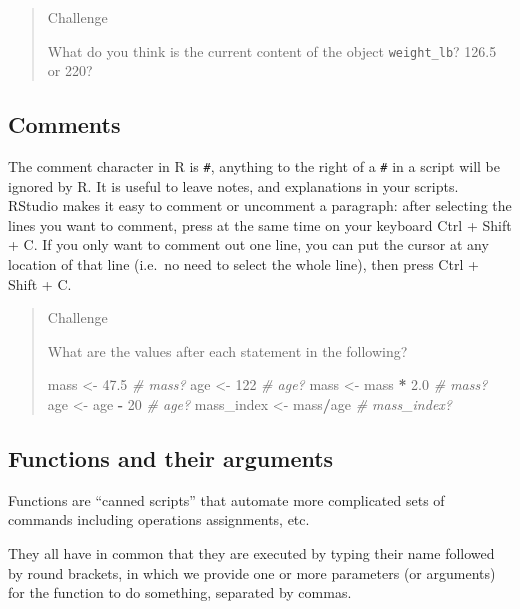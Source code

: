 \documentclass[]{book}
\newenvironment{Shaded}{\begin{snugshade}}{\end{snugshade}}
\newcommand{\DecValTok}[1]{\textcolor[rgb]{0.00,0.00,0.81}{#1}}
\newcommand{\FloatTok}[1]{\textcolor[rgb]{0.00,0.00,0.81}{#1}}
\newcommand{\StringTok}[1]{\textcolor[rgb]{0.31,0.60,0.02}{#1}}
\newcommand{\CommentTok}[1]{\textcolor[rgb]{0.56,0.35,0.01}{\textit{#1}}}
\newcommand{\OperatorTok}[1]{\textcolor[rgb]{0.81,0.36,0.00}{\textbf{#1}}}
\newcommand{\NormalTok}[1]{#1}
\theoremstyle{definition}
\theoremstyle{definition}
\theoremstyle{definition}
\theoremstyle{remark}
\begin{document}
\begin{quote}
Challenge

What do you think is the current content of the object
\texttt{weight\_lb}? 126.5 or 220?
\end{quote}

\subsection{Comments}\label{comments}

The comment character in R is \texttt{\#}, anything to the right of a
\texttt{\#} in a script will be ignored by R. It is useful to leave
notes, and explanations in your scripts. RStudio makes it easy to
comment or uncomment a paragraph: after selecting the lines you want to
comment, press at the same time on your keyboard Ctrl + Shift + C. If
you only want to comment out one line, you can put the cursor at any
location of that line (i.e.~no need to select the whole line), then
press Ctrl + Shift + C.

\begin{quote}
Challenge

What are the values after each statement in the following?

\begin{Shaded}
\begin{Highlighting}[]
\NormalTok{mass <-}\StringTok{ }\FloatTok{47.5}            \CommentTok{# mass?}
\NormalTok{age  <-}\StringTok{ }\DecValTok{122}             \CommentTok{# age?}
\NormalTok{mass <-}\StringTok{ }\NormalTok{mass }\OperatorTok{*}\StringTok{ }\FloatTok{2.0}      \CommentTok{# mass?}
\NormalTok{age  <-}\StringTok{ }\NormalTok{age }\OperatorTok{-}\StringTok{ }\DecValTok{20}        \CommentTok{# age?}
\NormalTok{mass_index <-}\StringTok{ }\NormalTok{mass}\OperatorTok{/}\NormalTok{age  }\CommentTok{# mass_index?}
\end{Highlighting}
\end{Shaded}
\end{quote}

\subsection{Functions and their
arguments}\label{functions-and-their-arguments}

Functions are ``canned scripts'' that automate more complicated sets of
commands including operations assignments, etc.

They all have in common that they are executed by typing their name
followed by round brackets, in which we provide one or more parameters
(or arguments) for the function to do something, separated by commas.
\end{document}
